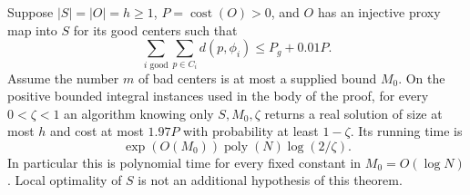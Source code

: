 \begin{theorem}
\label{comp:recovery}
Suppose $|S|=|O|=h\ge1$, $P=\operatorname{cost}(O)>0$, and $O$ has
an injective proxy map into $S$ for its good centers such that
\[
 \sum_{i\text{ good}}\sum_{p\in C_i}d(p,\phi_i)
       \le P_g+0.01P.
\]
Assume the number $m$ of bad centers is at most a supplied bound
$M_0$.  On the positive bounded integral instances used in the body
of the proof, for every $0<\zeta<1$ an algorithm knowing only
$S,M_0,\zeta$ returns a real solution of size at most $h$ and cost at
most $1.97P$ with probability at least $1-\zeta$.  Its running time is
\[
 \exp(O(M_0))\operatorname{poly}(N)\log(2/\zeta).
\]
In particular this is polynomial time for every fixed constant in
$M_0=O(\log N)$.  Local optimality of $S$ is not an additional
hypothesis of this theorem.
\end{theorem}

